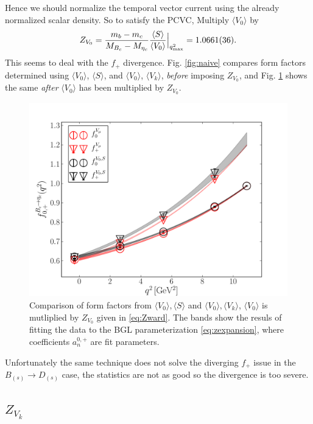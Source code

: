 Hence we should normalize the temporal vector current using the already normalized scalar density. So to satisfy the PCVC, Multiply $\langle V_0 \rangle$ by 
\begin{align}
	Z_{V_0} = {m_b-m_c \over M_{B_c}-M_{\eta_c} } { \langle S \rangle \over \langle V_0 \rangle }\Big\vert_{q^2_{\text{max}}} = 1.0661(36).
	\label{eq:Zward}
\end{align}
This seems to deal with the $f_+$ divergence. Fig. \ref{fig:naive} compares form factors determined using $\langle V_0 \rangle$, $\langle S \rangle$, and $\langle V_0 \rangle$, $\langle V_k \rangle$, {\textit{before}} imposing $Z_{V_0}$, and Fig. \ref{fig:Zward} shows the same {\textit{after}} $\langle V_0 \rangle$ has been multiplied by $Z_{V_0}$.
\begin{figure}[htb!]
\centering
\includegraphics[scale=0.55]{images/nrqcd/Bcetac_bothways_2.pdf}
\caption{Comparison of form factors from $\langle V_0 \rangle,\langle S \rangle $ and $\langle V_0\rangle,\langle V_k\rangle$, $\langle V_0\rangle$ is mutliplied by $Z_{V_0}$ given in \eqref{eq:Zward}. The bands show the resuls of fitting the data to the BGL parameterization \eqref{eq:zexpansion}, where coefficients $a^{0,+}_n$ are fit parameters. \label{fig:Zward}}
\end{figure}

Unfortunately the same technique does not solve the diverging $f_+$ issue in the $B_{(s)}\to D_{(s)}$ case, the statistics are not as good so the divergence is too severe. 

\subsection{$Z_{V_k}$}
\label{sec:ZVk}

